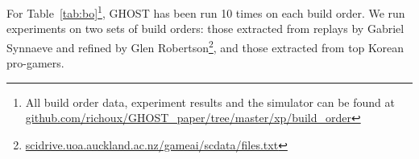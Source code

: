 \documentclass[journal]{IEEEtran}
\newcommand{\ghost}{\textsc{GHOST}\xspace}
\begin{document}
% 
For  Table~\ref{tab:bo}\footnote{All  build   order  data,  experiment
  results     and     the     simulator    can     be     found     at
  \href{https://github.com/richoux/GHOST\_paper/tree/master/xp/build\_order}{github.com/richoux/GHOST\_paper/tree/master/xp/build\_order}},
\ghost has been  run 10 times on each build  order. We run experiments
on two sets  of build orders: those extracted from  replays by Gabriel
Synnaeve\cite{SynnaeveDataset} and                  refined                  by                  Glen
Robertson\footnote{\href{http://scidrive.uoa.auckland.ac.nz/gameai/scdata/files.txt}{scidrive.uoa.auckland.ac.nz/gameai/scdata/files.txt}},
and those extracted from top Korean pro-gamers.
\end{document}
